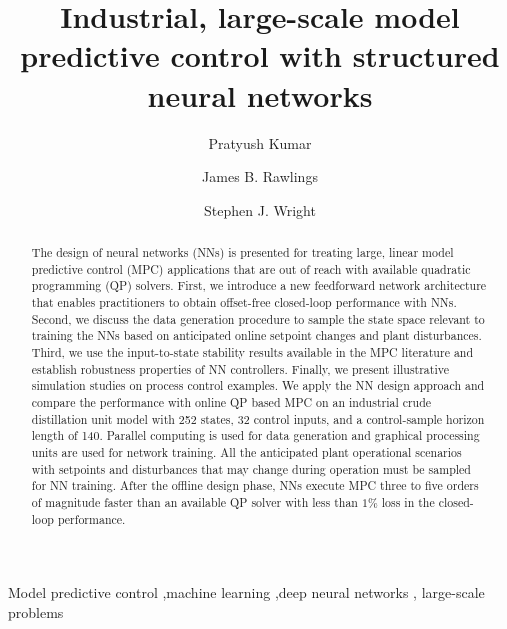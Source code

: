 \documentclass[preprint,5p, twocolumn, authoryear]{elsarticle}
\begin{document}
\begin{frontmatter}


\title{Industrial, large-scale model predictive control with structured neural
networks}

\author[label1]{Pratyush Kumar}

\author[label1]{James B. Rawlings}

\author[label2]{Stephen J. Wright}

\address[label1]{Department of Chemical Engineering, University of California, Santa Barbara, CA 93106, United States}
\address[label2]{Computer Sciences Department, University of Wisconsin-Madison, Madison, WI 53706, United States}

\begin{abstract}
The design of neural networks (NNs) is presented for treating large, linear
model predictive control (MPC) applications that are out of reach with available
quadratic programming (QP) solvers. First, we introduce a new feedforward
network architecture that enables practitioners to obtain offset-free
closed-loop performance with NNs. Second, we discuss the data generation
procedure to sample the state space relevant to training the NNs based on
anticipated online setpoint changes and plant disturbances. Third, we use the
input-to-state stability results available in the MPC literature and establish
robustness properties of NN controllers. Finally, we present illustrative
simulation studies on process control examples. We apply the NN design approach
and compare the performance with online QP based MPC on an industrial crude
distillation unit model with 252 states, 32 control inputs, and a control-sample
horizon length of 140. Parallel computing is used for data generation and
graphical processing units are used for network training. All the anticipated
plant operational scenarios with setpoints and disturbances that may change
during operation must be sampled for NN training. After the offline design
phase, NNs execute MPC three to five orders of magnitude faster than an
available QP solver with less than $1\%$ loss in the closed-loop performance.
\end{abstract}

\begin{keyword}
Model predictive control \sep machine learning \sep deep neural networks \sep
large-scale problems
\end{keyword}

\end{frontmatter}
\end{document}
